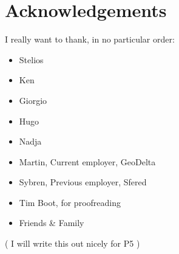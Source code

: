 
\chapter*{Acknowledgements}
I really want to thank, in no particular order:
\begin{itemize}
    \item Stelios
    \item Ken
    \item Giorgio
    \item Hugo
    \item Nadja
    \item Martin, Current employer, GeoDelta 
    \item Sybren, Previous employer, Sfered
    \item Tim Boot, for proofreading
    \item Friends \& Family
\end{itemize}
( I will write this out nicely for P5 )


 